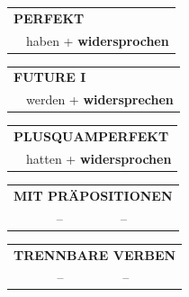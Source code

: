 \documentclass[10pt,a4paper]{revtex4-2}
\begin{document}
\begin{verbbox-dat}
 \begin{tabular}{rl}
     \multicolumn{2}{l}{\textbf{PERFEKT}}\\
   & haben + \textbf{widersprochen}\\
  \end{tabular}
\hfill
   \begin{tabular}{rl}
   
    \multicolumn{2}{l}{\textbf{FUTURE I} }\\
   & werden + \textbf{widersprechen}\\
 
  \end{tabular}
\hfill
   \begin{tabular}{rl}
      \multicolumn{2}{l}{\textbf{PLUSQUAMPERFEKT}}\\
   & hatten + \textbf{widersprochen}\\
  \end{tabular}

   \vspace{10pt}

   \begin{tabular}{lll}
      \multicolumn{3}{l}{\textbf{MIT PRÄPOSITIONEN}}\\
 & -- & --\\
\end{tabular}
  \hfill
   \begin{tabular}{lll}
      \multicolumn{3}{l}{\textbf{TRENNBARE VERBEN}}\\
 & -- & --\\
  \end{tabular}


  \vspace{-5pt}


\end{verbbox-dat}
\end{document}
